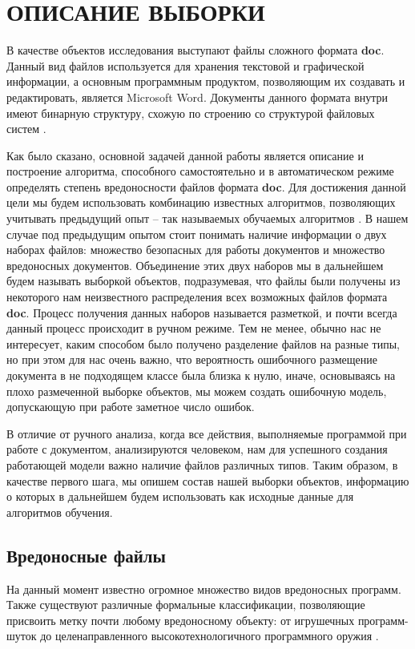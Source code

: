 \chapter{ОПИСАНИЕ ВЫБОРКИ}

В качестве объектов исследования выступают файлы сложного формата \textbf{doc}.
Данный вид файлов используется для хранения текстовой и графической информации, а основным программным продуктом, позволяющим их создавать и редактировать, является Microsoft Word.
Документы данного формата внутри имеют бинарную структуру, схожую по строению со структурой файловых систем \cite{doc_format}.

Как было сказано, основной задачей данной работы является описание и построение алгоритма, способного самостоятельно и в автоматическом режиме определять степень вредоносности файлов формата \textbf{doc}.
Для достижения данной цели мы будем использовать комбинацию известных алгоритмов, позволяющих учитывать предыдущий опыт -- так называемых обучаемых алгоритмов \cite{kad_01}.
В нашем случае под предыдущим опытом стоит понимать наличие информации о двух наборах файлов: множество безопасных для работы документов и множество вредоносных документов.
Объединение этих двух наборов мы в дальнейшем будем называть выборкой объектов, подразумевая, что файлы были получены из некоторого нам неизвестного распределения всех возможных файлов формата \textbf{doc}. 
Процесс получения данных наборов называется разметкой, и почти всегда данный процесс происходит в ручном режиме.
Тем не менее, обычно нас не интересует, каким способом было получено разделение файлов на разные типы, но при этом для нас очень важно, что вероятность ошибочного размещение документа в не подходящем классе была близка к нулю, иначе, основываясь на плохо размеченной выборке объектов, мы можем создать ошибочную модель, допускающую при работе заметное число ошибок.

В отличие от ручного анализа, когда все действия, выполняемые программой при работе с документом, анализируются человеком, нам для успешного создания работающей модели важно наличие файлов различных типов.
Таким образом, в качестве первого шага, мы опишем состав нашей выборки объектов, информацию о которых в дальнейшем будем использовать как исходные данные для алгоритмов обучения.

\section{Вредоносные файлы}

На данный момент известно огромное множество видов вредоносных программ.
Также существуют различные формальные классификации, позволяющие присвоить метку почти любому вредоносному объекту: от игрушечных программ-шуток до целенаправленного высокотехнологичного программного оружия \cite{lk_vir}.

